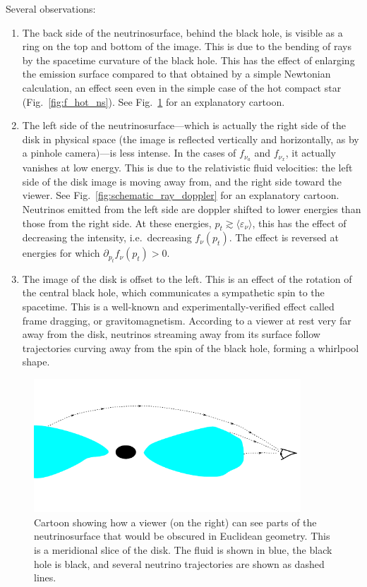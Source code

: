 Several observations:
\begin{enumerate}
  \item The back side of the neutrinosurface, behind the black hole, is visible
    as a ring on the top and bottom of the image.
    This is due to the bending of rays by the spacetime curvature of the black
    hole. This has the effect of enlarging the emission surface compared to
    that obtained by a simple Newtonian calculation, an effect seen even in
    the simple case of the hot compact star (Fig.~\ref{fig:f_hot_ns}).
    See Fig.~\ref{fig:schematic_ray_bending} for an explanatory cartoon.
  \item The left side of the neutrinosurface---which is actually the right
    side of the disk in physical space (the image is reflected vertically and
    horizontally, as by a pinhole camera)---is less intense. In the cases of
    $f_{\nu_a}$ and $f_{\nu_x}$, it actually vanishes at low energy.
    This is due to the relativistic fluid velocities: the left side of the disk
    image is moving away from, and the right side toward the viewer.
    See Fig.~\ref{fig:schematic_ray_doppler} for an explanatory cartoon.
    Neutrinos emitted from the left side are doppler shifted to lower energies
    than those from the right side. At these energies,
    $p_t\gtrsim\langle\varepsilon_\nu\rangle$,
    this has the effect of decreasing the intensity, i.e.\ decreasing
    $f_\nu(p_t)$.
    The effect is reversed at energies for which
    $\partial_{p_t}f_\nu(p_t)>0$.
  \item The image of the disk is offset to the left. This is an effect of the
    rotation of the central black hole, which communicates a sympathetic spin
    to the spacetime. This is a well-known and experimentally-verified effect
    \citep{ever2011-grav_b}
    called frame dragging, or gravitomagnetism.
    According to a viewer at rest very far away from the disk, neutrinos
    streaming away from its surface follow trajectories curving away from
    the spin of the black hole, forming a whirlpool shape.
\end{enumerate}

\begin{figure}
  \centering
  \includegraphics[width=10cm]{Figures/seeing_back_of_disk}
  \caption[Cartoon of neutrino rays bending over the disk]{
    Cartoon showing how a viewer (on the right) can see parts of the
    neutrinosurface that would be obscured in Euclidean geometry.
    This is a meridional slice of the disk. The fluid is shown in blue, the
    black hole is black, and several neutrino trajectories are shown as dashed
    lines.
  }
  \label{fig:schematic_ray_bending}
\end{figure}

